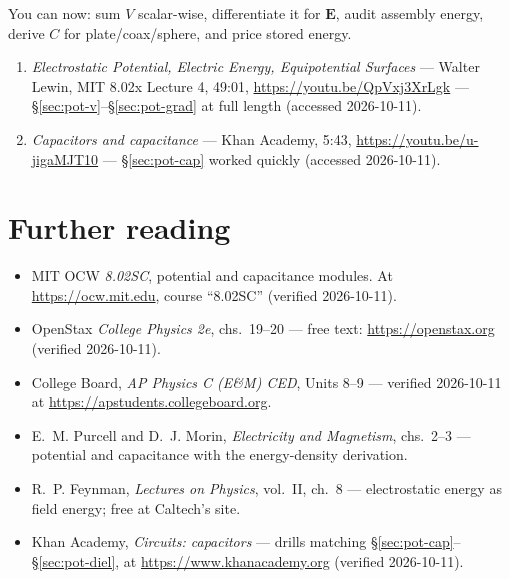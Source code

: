 \begin{wins}
You can now: sum $V$ scalar-wise, differentiate it for $\mathbf E$,
audit assembly energy, derive $C$ for plate/coax/sphere, and price
stored energy.
\end{wins}


\begin{rulebox}
\begin{enumerate}
\item \emph{Electrostatic Potential, Electric Energy, Equipotential
Surfaces} --- Walter Lewin, MIT 8.02x Lecture 4, 49:01,
\url{https://youtu.be/QpVxj3XrLgk} ---
\S\ref{sec:pot-v}--\S\ref{sec:pot-grad} at full length (accessed
2026-10-11).
\item \emph{Capacitors and capacitance} --- Khan Academy, 5:43,
\url{https://youtu.be/u-jigaMJT10} --- \S\ref{sec:pot-cap} worked
quickly (accessed 2026-10-11).
\end{enumerate}
\end{rulebox}

\section*{Further reading}

\begin{itemize}
\item MIT OCW \emph{8.02SC}, potential and capacitance modules. At
\url{https://ocw.mit.edu}, course ``8.02SC'' (verified 2026-10-11).
\item OpenStax \emph{College Physics 2e}, chs.~19--20 --- free text:
\url{https://openstax.org} (verified 2026-10-11).
\item College Board, \emph{AP Physics C (E\&M) CED}, Units 8--9 ---
verified 2026-10-11 at \url{https://apstudents.collegeboard.org}.
\item E.~M. Purcell and D.~J. Morin, \emph{Electricity and Magnetism},
chs.~2--3 --- potential and capacitance with the energy-density
derivation.
\item R.~P. Feynman, \emph{Lectures on Physics}, vol.~II, ch.~8 ---
electrostatic energy as field energy; free at Caltech's site.
\item Khan Academy, \emph{Circuits: capacitors} --- drills matching
\S\ref{sec:pot-cap}--\S\ref{sec:pot-diel}, at
\url{https://www.khanacademy.org} (verified 2026-10-11).
\end{itemize}

